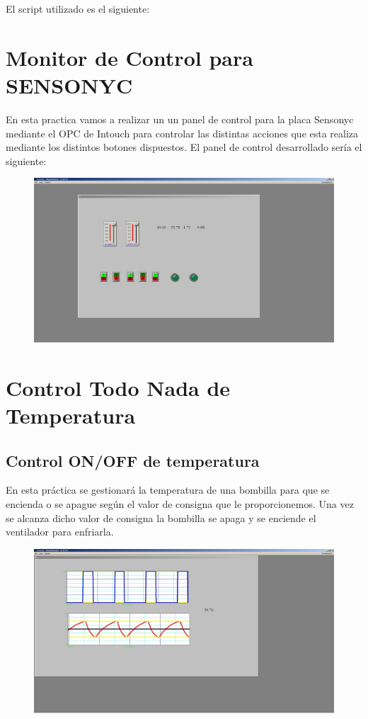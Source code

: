\documentclass[10pt,a4paper,spanish]{report}
\begin{document}
\noindent
El script utilizado es el siguiente:

\chapter{Monitor de Control para SENSONYC}

\noindent
En esta practica vamos a realizar un un panel de control para la placa Sensonyc mediante el OPC de Intouch para controlar las distintas acciones que esta realiza mediante los distintos botones dispuestos. El panel de control desarrollado sería el siguiente:

\begin{figure}[!hbp]
	\centering  \includegraphics[width=1\textwidth]{Imagenes/p2.JPG}
\end{figure}

\chapter{Control Todo Nada de Temperatura}

\section{Control ON/OFF de temperatura}

\noindent
En esta práctica se gestionará la temperatura de una bombilla para que se encienda o se apague según el valor de consigna que le proporcionemos. Una vez se alcanza dicho valor de consigna la bombilla se apaga y se enciende el ventilador para enfriarla.

\begin{figure}[!hbp]
	\centering  \includegraphics[width=1\textwidth]{Imagenes/p3-1.JPG}
\end{figure}
\end{document}
